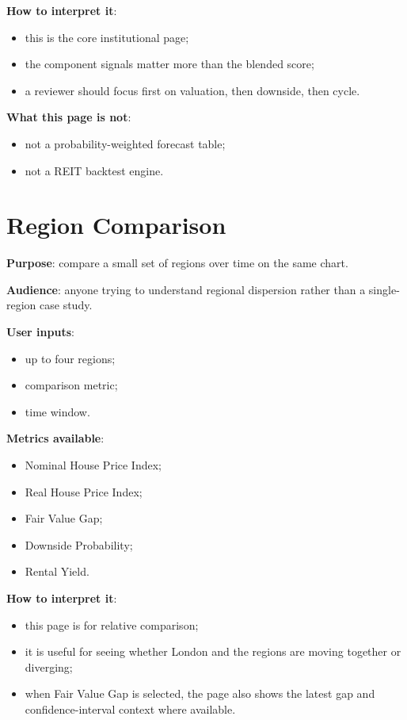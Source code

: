 \documentclass[11pt,a4paper]{article}
\begin{document}
\textbf{How to interpret it}:
\begin{itemize}[leftmargin=1.5em]
  \item this is the core institutional page;
  \item the component signals matter more than the blended score;
  \item a reviewer should focus first on valuation, then downside, then cycle.
\end{itemize}

\textbf{What this page is not}:
\begin{itemize}[leftmargin=1.5em]
  \item not a probability-weighted forecast table;
  \item not a REIT backtest engine.
\end{itemize}

\section{Region Comparison}

\textbf{Purpose}: compare a small set of regions over time on the same chart.

\textbf{Audience}: anyone trying to understand regional dispersion rather than
a single-region case study.

\textbf{User inputs}:
\begin{itemize}[leftmargin=1.5em]
  \item up to four regions;
  \item comparison metric;
  \item time window.
\end{itemize}

\textbf{Metrics available}:
\begin{itemize}[leftmargin=1.5em]
  \item Nominal House Price Index;
  \item Real House Price Index;
  \item Fair Value Gap;
  \item Downside Probability;
  \item Rental Yield.
\end{itemize}

\textbf{How to interpret it}:
\begin{itemize}[leftmargin=1.5em]
  \item this page is for relative comparison;
  \item it is useful for seeing whether London and the regions are moving together or diverging;
  \item when Fair Value Gap is selected, the page also shows the latest gap and confidence-interval context where available.
\end{itemize}
\end{document}
